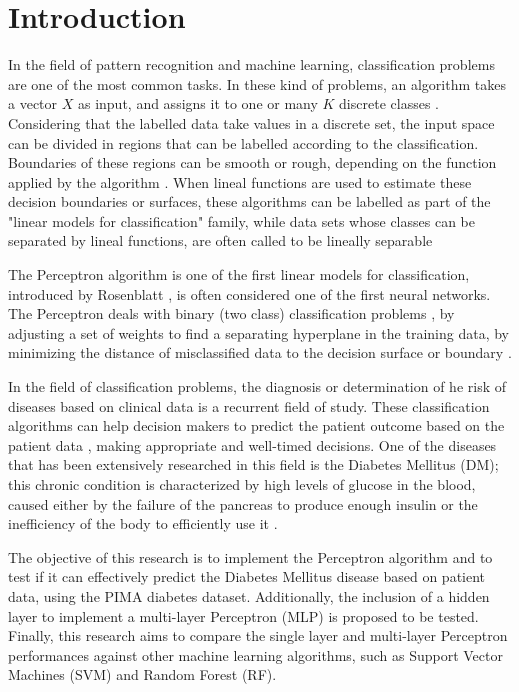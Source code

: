 \documentclass[10pt,twocolumn,letterpaper]{article}
\begin{document}
\section{Introduction}

In the field of pattern recognition and machine learning, classification problems are one of the most common tasks. In these kind of problems, an algorithm takes a vector $X$ as input, and assigns it to one or many $K$ discrete classes \cite{Bishop2006}. Considering that the labelled data take values in a discrete set, the input space can be divided in regions that can be labelled according to the classification. Boundaries of these regions can be smooth or rough, depending on the function applied by the algorithm \cite{Hastie2009}. When lineal functions are used to estimate these decision boundaries or surfaces, these algorithms can be labelled as part of the "linear models for classification" family, while data sets whose classes can be separated by lineal functions, are often called to be lineally separable \cite{Bishop2006}

The Perceptron algorithm is one of the first linear models for classification, introduced by Rosenblatt \cite{Rosenblatt1957}, is often considered one of the first neural networks. The Perceptron deals with binary (two class) classification problems \cite{Bishop2006}, by adjusting a set of weights to find a separating hyperplane in the training data, by minimizing the distance of misclassified data to the decision surface or boundary \cite{Hastie2009}.

In the field of classification problems, the diagnosis or determination of he risk of diseases based on clinical data is a recurrent field of study. These classification algorithms can help decision makers to predict the patient outcome based on the patient data \cite{Bellazzi2008}, making appropriate and well-timed decisions. One of the diseases that has been extensively researched in this field is the Diabetes Mellitus (DM); this chronic condition is characterized by high levels of glucose in the blood, caused either by the failure of the pancreas to produce enough insulin or the inefficiency of the body to efficiently use it \cite{Wu2018}. 

The objective of this research is to implement the Perceptron algorithm and to test if it can effectively predict the Diabetes Mellitus disease based on patient data, using the PIMA diabetes dataset. Additionally, the inclusion of a hidden layer to implement a multi-layer Perceptron (MLP) is proposed to be tested. Finally, this research aims to compare the single layer and multi-layer Perceptron performances against other machine learning algorithms, such as Support Vector Machines (SVM) and Random Forest (RF).
\end{document}
